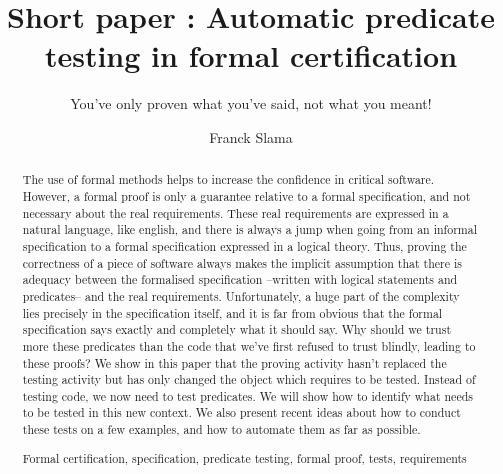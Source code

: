 \documentclass[runningheads,a4paper]{llncs}
\newcommand{\keywords}[1]{\par\addvspace\baselineskip
\noindent\keywordname\enspace\ignorespaces#1}
\begin{document}
\mainmatter  %

\title{Short paper : Automatic predicate testing in formal certification}
\subtitle{You've only proven what you've said, not what you meant!}



\author{Franck Slama\\
         }


\maketitle


\begin{abstract}
The use of formal methods helps to increase the confidence in critical software. However, a formal proof is only a guarantee relative to a formal specification, and not necessary about the real requirements. These real requirements are expressed in a natural language, like english, and there is always a jump when going from an informal specification to a formal specification expressed in a logical theory. Thus, proving the correctness of a piece of software always makes the implicit assumption that there is adequacy between the formalised specification --written with logical statements and predicates-- and the real requirements. Unfortunately, a huge part of the complexity lies precisely in the specification itself, and it is far from obvious that the formal specification says exactly and completely what it should say. Why should we trust more these predicates than the code that we've first refused to trust blindly, leading to these proofs? We show in this paper that the proving activity hasn't replaced the testing activity but has only changed the object which requires to be tested. Instead of testing code, we now need to test predicates. We will show how to identify what needs to be tested in this new context. We also present recent ideas about how to conduct these tests on a few examples, and how to automate them as far as possible.

\keywords{Formal certification, specification, predicate testing, formal proof, tests, requirements}
\end{abstract}



\end{document}
